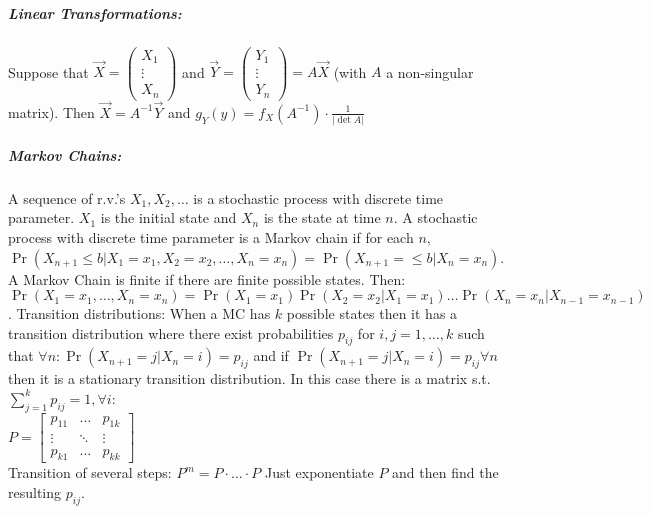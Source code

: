 \documentclass[landscape,10pt]{article}
\begin{document}
\begin{multicols}{4}
 \subparagraph*{Linear Transformations: } Suppose that 
 \(\vec{X} = 
    \begin{pmatrix}
        X_1\\
        \vdots{}\\ 
        X_n
    \end{pmatrix}\) and 
\(\vec{Y} = 
    \begin{pmatrix}
        Y_1\\
        \vdots{} \\
        Y_n
    \end{pmatrix}
    = A\vec{X}\) (with \(A\) a non-singular matrix). Then \(\vec{X} = A^{-1}\vec{Y}\) and \(g_Y(y) = f_X(A^{-1})\cdot\frac{1}{\left|\det A\right|}\)

\subparagraph*{Markov Chains: }
A sequence of r.v.'s \(X_1, X_2, \ldots\) is a stochastic process with discrete time parameter. \(X_1\) is the initial state and \(X_n\) is the state at time \(n\). A stochastic process with discrete time parameter is a Markov chain if for each \(n\), \(\Pr(X_{n+1} \leq b | X_1 = x_1, X_2 = x_2, \ldots, X_n = x_n) = \Pr(X_{n+1} = \leq b | X_n = x_n)\). A Markov Chain is finite if there are finite possible states. Then: \(\Pr(X_1 = x_1, \ldots, X_n = x_n) = \Pr(X_1 = x_1) \Pr(X_2 = x_2 | X_1 = x_1) \ldots \Pr(X_n = x_n | X_{n-1} = x_{n-1}) \). Transition distributions: When a MC has \(k\) possible states then it has a transition distribution where there exist probabilities \(p_{ij}\) for \(i, j = 1, \ldots , k\) such that \(\forall n: \Pr(X_{n+1} = j | X_n = i) = p_{ij}\) and if \(\Pr(X_{n+1} = j | X_n = i) = p_{ij} \forall n\) then it is a stationary transition distribution. In this case there is a matrix s.t. \(\sum\limits_{j=1}^{k}{p_{ij}}=1,  \forall i\): \\
\(P = \begin{bmatrix} 
        p_{11} & \hdots & p_{1k} \\
        \vdots & \ddots & \vdots \\
         p_{k1} & \hdots & p_{kk}
     \end{bmatrix}\)\\     
Transition of several steps: \(P^m = P \cdot \ldots \cdot P\) Just exponentiate \(P\) and then find the resulting \(p_{ij}\).


\end{multicols}
\end{document}
